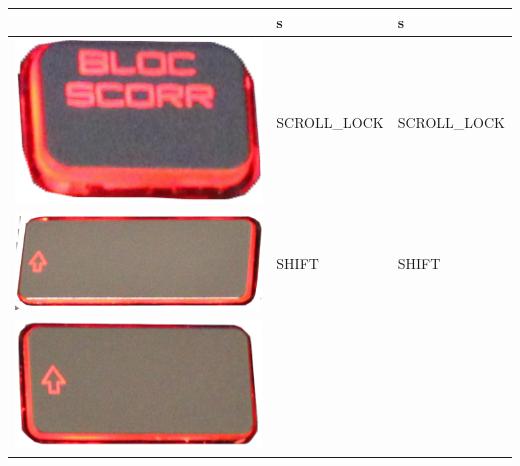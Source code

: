\begin{longtable}{|cll|}
\begin{minipage}[c]{.3\textwidth}
\vspace{0.2cm}
\end{minipage} & s & s\\
\hline
\begin{minipage}[c]{.3\textwidth}
\vspace{0.2cm}
\includegraphics[scale=0.06]{Images/KeyMapping/SCROLL_LOCK}
\vspace{0.2cm}
\end{minipage} & SCROLL\_LOCK & SCROLL\_LOCK\\
\hline
\begin{minipage}[c]{.3\textwidth}
\vspace{0.2cm}
\includegraphics[scale=0.06]{Images/KeyMapping/SHIFT}
\vspace{0.2cm}
\end{minipage} & SHIFT & SHIFT\\
\hline
\begin{minipage}[c]{.3\textwidth}
\vspace{0.2cm}
\includegraphics[scale=0.06]{Images/KeyMapping/SHIFT_R}

\end{minipage}
\end{longtable}
